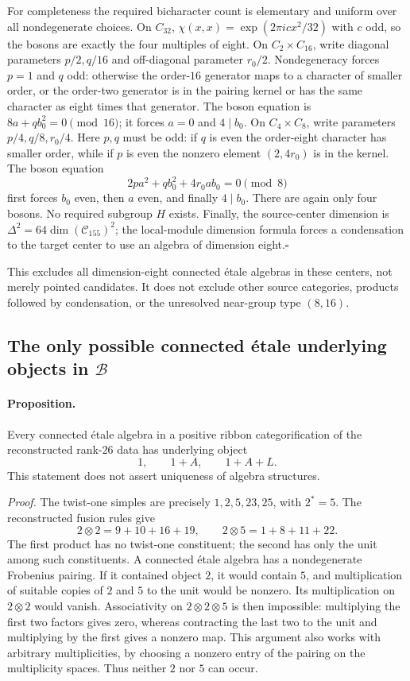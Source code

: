 For completeness the required bicharacter count is elementary and
uniform over all nondegenerate choices. On $C_{32}$,
$\chi(x,x)=\exp(2\pi i c x^2/32)$ with $c$ odd, so the bosons are exactly
the four multiples of eight. On $C_2\times C_{16}$, write diagonal
parameters $p/2,q/16$ and off-diagonal parameter $r_0/2$.
Nondegeneracy forces $p=1$ and $q$ odd: otherwise the order-$16$
generator maps to a character of smaller order, or the order-two
generator is in the pairing kernel or has the same character as eight
times that generator. The boson equation is
$8a+qb_0^2=0\pmod {16}$; it forces $a=0$ and $4\mid b_0$.
On $C_4\times C_8$, write parameters $p/4,q/8,r_0/4$.
Here $p,q$ must be odd: if $q$ is even the order-eight character has
smaller order, while if $p$ is even the nonzero element $(2,4r_0)$ is in
the kernel. The boson equation
\[
 2pa^2+qb_0^2+4r_0ab_0=0\pmod8
\]
first forces $b_0$ even, then $a$ even, and finally $4\mid b_0$.
There are again only four bosons. No required subgroup $H$ exists.
Finally, the source-center dimension is $\Delta^2=64\dim(\mathcal C_{155})^2$;
the local-module dimension formula forces a condensation to the target
center to use an algebra of dimension eight.\hfill$\square$

This excludes all dimension-eight connected \'etale algebras in these
centers, not merely pointed candidates. It does not exclude other source
categories, products followed by condensation, or the unresolved
near-group type $(8,16)$.

\subsection{The only possible connected \'etale underlying objects in
$\mathcal B$}

\paragraph{Proposition.}
Every connected \'etale algebra in a positive ribbon categorification of
the reconstructed rank-$26$ data has underlying object
\[
             1,\qquad 1+A,\qquad 1+A+L.
\]
This statement does not assert uniqueness of algebra structures.

\emph{Proof.}
The twist-one simples are precisely $1,2,5,23,25$, with $2^*=5$.
The reconstructed fusion rules give
\[
 2\otimes2=9+10+16+19,\qquad
 2\otimes5=1+8+11+22.
\]
The first product has no twist-one constituent; the second has only the
unit among such constituents. A connected \'etale algebra has a
nondegenerate Frobenius pairing. If it contained object $2$, it would
contain $5$, and multiplication of suitable copies of $2$ and $5$ to the
unit would be nonzero. Its multiplication on $2\otimes2$ would vanish.
Associativity on $2\otimes2\otimes5$ is then impossible: multiplying the
first two factors gives zero, whereas contracting the last two to the
unit and multiplying by the first gives a nonzero map. This argument
also works with arbitrary multiplicities, by choosing a nonzero entry
of the pairing on the multiplicity spaces. Thus neither $2$ nor $5$
can occur.

